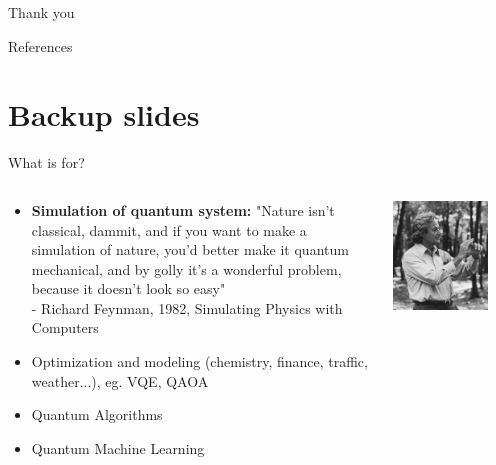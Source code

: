 \documentclass[aspectratio=169,10pt]{beamer}
\newcounter{mainframenumber}
\newcommand{\backupbegin}{
  \setcounter{mainframenumber}{\value{framenumber}}
}
\begin{document}
\begin{frame}[t,standout]
\Large
Thank you
\end{frame}


\backupbegin
\appendix

\begin{frame}{References}
    \printbibliography
\end{frame}


\section*{Backup slides}

\begin{frame}{What is for?}
  \begin{columns}
    \begin{column}{0.5\textwidth}
      \begin{itemize}[label=\textbullet]
        \item \textbf{Simulation of quantum system:} "Nature isn't classical, dammit, and if you want to make a simulation of nature, you'd better make it quantum mechanical, and by golly it's a wonderful problem, because it doesn't look so easy"\\
                 - Richard Feynman, 1982, Simulating Physics with Computers
        \item Optimization and modeling (chemistry, finance, traffic, weather...), eg. VQE, QAOA
        \item Quantum Algorithms 
        \item Quantum Machine Learning
      \end{itemize}
      \end{column}
      \begin{column}{0.5\textwidth}
        \begin{center}
            \includegraphics[width=0.8\textwidth]{figures/feynmann.jpg}

\end{center}
\end{column}
\end{columns}
\end{frame}
\end{document}
